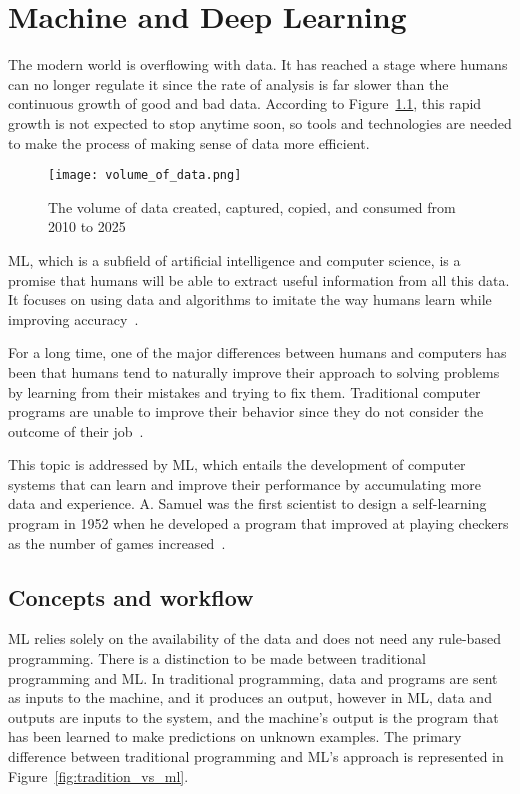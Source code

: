 \chapter{Machine and Deep Learning} \label{sec:ml}

The modern world is overflowing with data. It has reached a stage where humans can no longer regulate it since the rate of analysis is far slower than the continuous growth of good and bad data. According to Figure~\ref{fig:volume_of_data}, this rapid growth is not expected to stop anytime soon, so tools and technologies are needed to make the process of making sense of data more efficient.

\begin{figure}[htbp]
    \centering
    \texttt{[image: volume\_of\_data.png]}
    \caption{The volume of data created, captured, copied, and consumed from 2010 to 2025~\cite{TotalStatista}}
    \label{fig:volume_of_data}
\end{figure}

\gls{ML}, which is a subfield of artificial intelligence and computer science, is a promise that humans will be able to extract useful information from all this data. It focuses on using data and algorithms to imitate the way humans learn while improving accuracy~\cite{IBMCloudEducationWhatLearning}.

For a long time, one of the major differences between humans and computers has been that humans tend to naturally improve their approach to solving problems by learning from their mistakes and trying to fix them. Traditional computer programs are unable to improve their behavior since they do not consider the outcome of their job~\cite{Luckert2016UsingDocuments}. 

This topic is addressed by \gls{ML}, which entails the development of computer systems that can learn and improve their performance by accumulating more data and experience. A. Samuel was the first scientist to design a self-learning program in 1952 when he developed a program that improved at playing checkers as the number of games increased~\cite{Samuel1959SomeCheckers,Luckert2016UsingDocuments}. 

\section{Concepts and workflow}

\gls{ML} relies solely on the availability of the data and does not need any rule-based programming. There is a distinction to be made between traditional programming and \gls{ML}. In traditional programming, data and programs are sent as inputs to the machine, and it produces an output, however in \gls{ML}, data and outputs are inputs to the system, and the machine's output is the program that has been learned to make predictions on unknown examples. The primary difference between traditional programming and \gls{ML}'s approach is represented in Figure~\ref{fig:tradition_vs_ml}.

